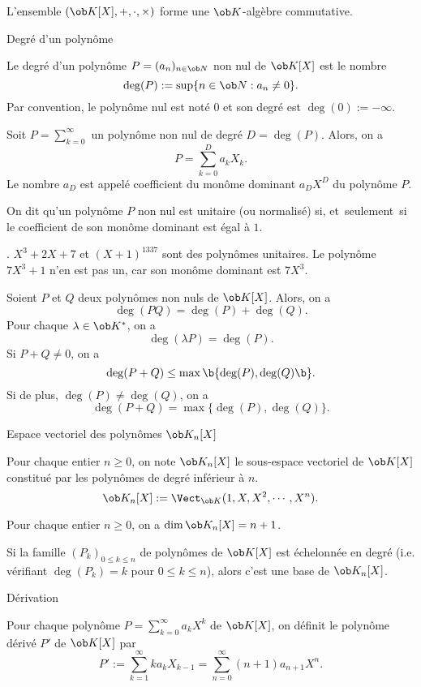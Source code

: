 \Theoreme []  L'ensemble $(\ob K[X],+,\cdot,\times)$ forme une $\ob K$-alg\`ebre commutative. 

\Concept [] Degr\'e d'un polyn\^ome


\Definition []  Le degr\'e d'un polyn\^ome $P=(a_n)_{n\in\ob N}$ non nul de $\ob K[X]$ est le nombre
$$
\deg(P):=\sup\{n\in\ob N:a_n\neq0\}.
$$
Par convention, le polyn\^ome nul est not\'e $0$ et son degr\'e est $\deg(0):=-\infty$. 
\bigskip

\Definition []  Soit $P=\sum_{k=0}^\infty$ un polyn\^ome non nul de degr\'e $D=\deg(P)$. Alors, on a 
$$
P=\sum_{k=0}^Da_kX_k.
$$
Le nombre $a_D$ est appel\'e coefficient du mon\^ome dominant $a_DX^D$ du polyn\^ome $P$. 
\bigskip

\Definition []  On dit qu'un polyn\^ome $P$ non nul est unitaire (ou normalis\'e) si, et~seulement~si le coefficient de son mon\^ome dominant est \'egal \`a $1$. 
\bigskip

\Exemple. $X^3+2X+7$ et $(X+1)^{1337}$ sont des polyn\^omes unitaires. Le polyn\^ome $7X^3+1$ n'en est pas un, car son mon\^ome dominant est $7X^3$. 
\bigskip

 
\Propriete []  Soient $P$ et $Q$ deux polyn\^omes non nuls de $\ob K[X]$. Alors, on a 
$$
\deg(PQ)=\deg(P)+\deg(Q).
$$
Pour chaque $\lambda\in\ob K^*$, on a 
$$
\deg(\lambda P)=\deg(P).
$$
Si $P+Q\neq0$, on a 
$$
\deg(P+Q)\le\max\b\{\deg(P),\deg(Q)\b\}.
$$
Si de plus, $\deg(P)\neq\deg(Q)$, on a 
$$
\deg(P+Q)=\max\{\deg(P),\deg(Q)\}.
$$

\Concept [] Espace vectoriel des polyn\^omes $\ob K_n[X]$ 


\Definition []  Pour chaque entier $n\ge0$, on note $\ob K_n[X]$ le sous-espace vectoriel de $\ob K[X]$ constitu\'e par les polyn\^omes de degr\'e inf\'erieur \`a $n$. 
$$
\ob K_n[X]:=\Vect_{\ob K}(1,X,X^2,\cdots,X^n).
$$

\Propriete []  Pour chaque entier $n\ge0$, on a $\dim\ob K_n[X]=n+1$. 
\bigskip

\Propriete []  Si la famille $(P_k)_{0\le k\le n}$ de polyn\^omes de $\ob K[X]$ est \'echelonn\'ee en degr\'e (i.e. v\'erifiant $\deg(P_k)=k$ pour $0\le k\le n$), alors 
c'est une base de $\ob K_n[X]$. 

\Concept [] D\'erivation


\Definition []  Pour chaque polyn\^ome $P=\sum_{k=0}^\infty a_kX^k$ de $\ob K[X]$, on d\'efinit le polyn\^ome d\'eriv\'e $P'$ de $\ob K[X]$ par 
$$
P':=\sum_{k=1}^\infty ka_kX_{k-1}=\sum_{n=0}^\infty(n+1)a_{n+1}X^n.
$$

